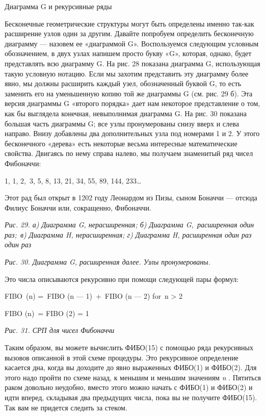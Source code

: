 Диаграмма G и рекурсивные ряды

Бесконечные геометрические структуры могут быть определены именно так-как расширение узлов один за другим. Давайте попробуем определить бесконечную диаграмму --- назовем ее «диаграммой G». Воспользуемся следующим условным обозначением, в двух узлах напишем просто букву «G», которая, однако, будет представлять всю диаграмму G. На рис. 28 показана диаграмма G, использующая такую условную нотацию. Если мы захотим представить эту диаграмму более явно, мы должны расширить каждый узел, обозначенный буквой G, то есть заменить его на уменьшенную копию той же диаграммы G (см. рис. 29 б). Эта версия диаграммы G «второго порядка» дает нам некоторое представление о том, как бы выглядела конечная, невыполнимая диаграмма G. На рис. 30 показана большая часть диаграммы G; все узлы пронумерованы снизу вверх и слева направо. Внизу добавлены два дополнительных узла под номерами 1 и 2. У этого бесконечного «дерева» есть некоторые весьма интересные математические свойства. Двигаясь по нему справа налево, мы получаем знаменитый ряд чисел Фибоначчи:

1, 1, 2,~3, 5, 8, 13, 21, 34, 55, 89, 144, 233\ldots{}

Этот рад был открыт в 1202 году Леонардом из Пизы, сыном Боначчи --- отсюда Филиус Боначчи или, сокращенно, Фибоначчи.

\emph{Рис. 29. а) Диаграмма G, нерасширенная; б) Диаграмма G,~расширенная один раз;~в) Диаграмма H, нерасширенная; г) Диаграмма H, расширенная один раз один раз}

\emph{Рис. 30. Диаграмма G, расширенная далее. Узлы пронумерованы.}

Это числа описываются рекурсивно при помощи следующей пары формул:

FIBO~(n) =~FIBO (n --- 1)~+~FIBO (n --- 2) for~n \textgreater{} 2

FIBO (n)~= FIBO (2) = 1

\emph{Рис. 31. СРП для чисел Фибоначчи}

Таким образом, вы можете вычислить ФИБО(15) с помощью ряда рекурсивных вызовов описанной в этой схеме процедуры. Это рекурсивное определение касается дна, когда вы доходите до явно выраженных ФИБО(1) и ФИБО(2). Для этого надо пройти по схеме назад, к меньшим и меньшим значениям \emph{n} . Пятиться раком довольно неудобно, вместо этого можно начать с ФИБО(1) и ФИБО(2) и идти вперед, складывая два предыдущих числа, пока вы не получите ФИБО(15). Так вам не придется следить за стеком.

